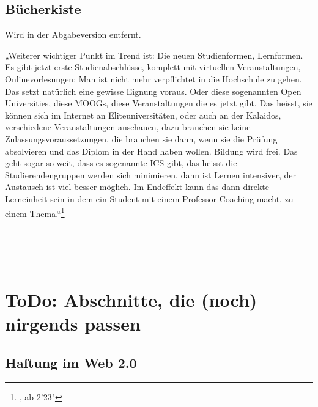 

\subsection{Bücherkiste} %
\label{sub:bucherkiste}

Wird in der Abgabeversion entfernt.

„Weiterer wichtiger Punkt im Trend ist: Die neuen Studienformen, Lernformen. Es gibt jetzt erste Studienabschlüsse, komplett mit virtuellen Veranstaltungen, Onlinevorlesungen: Man ist nicht mehr verpflichtet in die Hochschule zu gehen. Das setzt natürlich eine gewisse Eignung voraus. Oder diese sogenannten Open Universities, diese MOOGs, diese Veranstaltungen die es jetzt gibt. Das heisst, sie können sich im Internet an Eliteuniversitäten, oder auch an der Kalaidos, verschiedene Veranstaltungen anschauen, dazu brauchen sie keine Zulassungsvoraussetzungen, die brauchen sie dann, wenn sie die Prüfung absolvieren und das Diplom in der Hand haben wollen. Bildung wird frei. Das geht sogar so weit, dass es sogenannte ICS gibt, das heisst die Studierendengruppen werden sich minimieren, dann ist Lernen intensiver, der Austausch ist viel besser möglich. Im Endeffekt kann das dann direkte Lerneinheit sein in dem  ein Student mit einem Professor Coaching macht, zu einem Thema.“\footnote{\cite{roegner:trends}, ab 2'23"}

\cite{meggle}\\
\cite{ojstersek}\\
\cite{schulmeister}\\



\section{ToDo: Abschnitte, die (noch) nirgends passen} %
\label{sec:noch_ein_anhang}


\subsection{Haftung im Web 2.0} %
\label{sub:haftung_im_web_2_0}




